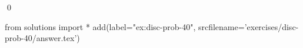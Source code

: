 
\begin{ex} 
  \label{ex:disc-prob-40}
  
  \qed
\end{ex} 
\begin{python0}
from solutions import *
add(label="ex:disc-prob-40",
    srcfilename='exercises/disc-prob-40/answer.tex') 
\end{python0}
